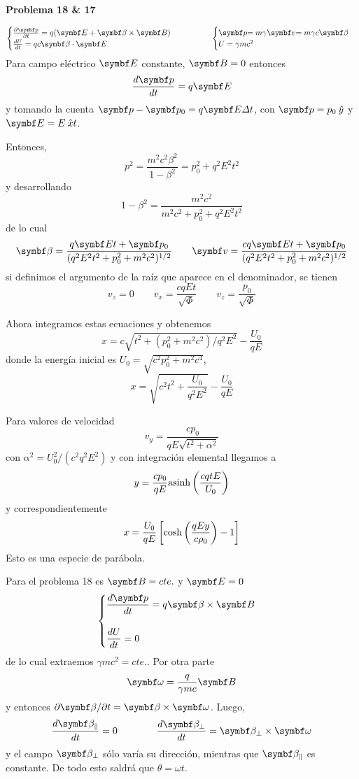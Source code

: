 \documentclass[10pt,oneside]{CBFT_book}
\begin{document}
\begin{ejemplo}{\bf Problema 18 \& 17}

\[
	\begin{cases}
	\frac{\partial \vb{p}}{\partial t} = q ( \vb{E} + \pv{\beta}{B} ) \\
	\dtot{U}{t} = q c \pe{\beta}{E}
	\end{cases}
	\qquad \qquad 
	\begin{cases}
	$\vb{p}$ = m \gamma $\vb{v}$ = m \gamma c $\vb{\beta}$ \\
	U = \gamma m c^2 
	\end{cases}
\]
Para campo eléctrico $\vb{E}$ constante, $\vb{B}=0$ entonces 
\[
	\dtot{\vb{p}}{t} = q \vb{E} 
\]
y tomando la cuenta $\vb{p} - \vb{p}_0 = q \vb{E} \Delta t $, con $\vb{p} = p_0\yver$
y $\vb{E} = E\xver t$.

Entonces,
\[
	p^2 = \frac{ m^2 c^2 \beta^2 }{ 1 - \beta^2 } = p_0^2 + q^2 E^2 t^2
\]
y desarrollando
\[
	1 - \beta^2 = \frac{ m^2 c^2 }{ m^2 c^2 + p_0^2 + q^2 E^2 t^2 }
\]
de lo cual
\[
	\vb{\beta} = \frac{ q \vb{E} t + \vb{p}_0 }{ ( q^2 E^2 t^2 + p_0^2 + m^2 c^2 )^{1/2} }
	\qquad 
	\vb{v} = \frac{ c q \vb{E} t + \vb{p}_0 }{ ( q^2 E^2 t^2 + p_0^2 + m^2 c^2 )^{1/2} }
\]
si definimos el argumento de la raíz que aparece en el denominador, se tienen
\[
	v_z= 0 
	\qquad 
	v_x = \frac{c q E t}{ \sqrt{ \Phi } }
	\qquad 
	v_z = \frac{ p_0 }{ \sqrt{ \Phi } }
\]
 
Ahora integramos estas ecuaciones y obtenemos
\[
	x = c \sqrt{ t^2 + (p_0^2 + m^2 c^2) / q^2 E^2} - \frac{U_0}{qE}
\]
donde la energía inicial es $U_0 = \sqrt{ c^2p_0^2 + m^2c^4 }$, 
\[
	x = \sqrt{ c^2t^2 + \frac{U_0}{q^2E^2} } -  \frac{U_0}{qE}
\]

Para valores de velocidad
\[
	v_y = \frac{ c p_0 }{ q E \sqrt{ t^2 + \alpha^2 } }
\]
con $ \alpha^2 = U_0^2/( c^2 q^2 E^2 )$ y con integración elemental llegamos a
\[
	y = \frac{ c p_0 }{ q E } \mathrm{ asinh }\left( \frac{  c q t E  }{ U_0 } \right)
\]
y correspondientemente
\[
	x = \frac{ U_0 }{ q E }\left[ \cosh\left( \frac{  q E y  }{  c \rho_0  } \right) - 1 \right]
\]
Esto es una especie de parábola.

Para el problema 18 es $\vb{B} = cte.$ y $\vb{E}=0$ 
\[
	\begin{cases}
	\displaystyle \frac{d\vb{p}}{dt} = q \pv{\beta}{B} \\
	\\
	\displaystyle \dtot{U}{t} = 0
	\end{cases}
\]
de lo cual extraemos $ \gamma m c^2 = cte. $. Por otra parte
\[
	\vb{\omega} = \frac{q}{\gamma m c}\vb{B}
\]
y entonces $ \partial \vb{\beta} / \partial t = \pv{\beta}{\omega} $.
Luego,
\[
	\dtot{\vb{\beta}_\parallel}{t} = 0 \qquad \qquad
	\dtot{\vb{\beta}_\perp}{t} = \pv{\beta_\perp}{\omega}
\]
y el campo $ \vb{\beta}_\perp $ sólo varía su dirección, mientras que $\vb{\beta}_\parallel$
es constante. De todo esto saldrá que $\theta = \omega t$.


\end{ejemplo}
\end{document}
